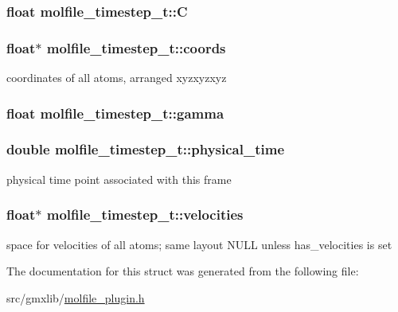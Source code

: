 \hypertarget{structmolfile__timestep__t_a9d2ab348266a6d35067fc08f991f2885}{
\subsubsection[{\-C}]{\setlength{\rightskip}{0pt plus 5cm}float {\bf molfile\-\_\-timestep\-\_\-t\-::\-C}}}\label{structmolfile__timestep__t_a9d2ab348266a6d35067fc08f991f2885}
\hypertarget{structmolfile__timestep__t_a8095ee7fd2ec8ae513c6c6662c52f516}{
\subsubsection[{coords}]{\setlength{\rightskip}{0pt plus 5cm}float$\ast$ {\bf molfile\-\_\-timestep\-\_\-t\-::coords}}}\label{structmolfile__timestep__t_a8095ee7fd2ec8ae513c6c6662c52f516}
coordinates of all atoms, arranged xyzxyzxyz \hypertarget{structmolfile__timestep__t_a74948ba5f866c2c0c7b32195cf39e378}{
\subsubsection[{gamma}]{\setlength{\rightskip}{0pt plus 5cm}float {\bf molfile\-\_\-timestep\-\_\-t\-::gamma}}}\label{structmolfile__timestep__t_a74948ba5f866c2c0c7b32195cf39e378}
\hypertarget{structmolfile__timestep__t_a4ee1422c39ad8f4eadc37e3dda508746}{
\subsubsection[{physical\-\_\-time}]{\setlength{\rightskip}{0pt plus 5cm}double {\bf molfile\-\_\-timestep\-\_\-t\-::physical\-\_\-time}}}\label{structmolfile__timestep__t_a4ee1422c39ad8f4eadc37e3dda508746}
physical time point associated with this frame \hypertarget{structmolfile__timestep__t_acbc159e9adef19c860d42beab1e5cb96}{
\subsubsection[{velocities}]{\setlength{\rightskip}{0pt plus 5cm}float$\ast$ {\bf molfile\-\_\-timestep\-\_\-t\-::velocities}}}\label{structmolfile__timestep__t_acbc159e9adef19c860d42beab1e5cb96}
space for velocities of all atoms; same layout \-N\-U\-L\-L unless has\-\_\-velocities is set 

\-The documentation for this struct was generated from the following file\-:\begin{DoxyCompactItemize}
\item 
src/gmxlib/\hyperlink{molfile__plugin_8h}{molfile\-\_\-plugin.\-h}\end{DoxyCompactItemize}
